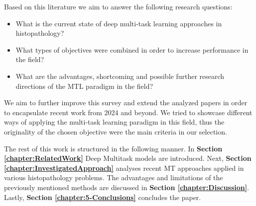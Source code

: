 \documentclass[conference]{IEEEtran}
\begin{document}
Based on this literature we aim to answer the following research questions:
\begin{itemize}
  \item What is the current state of deep multi-task learning approaches in histopathology?
  \item What types of objectives were combined in order to increase performance in the field?
  \item What are the advantages, shortcoming and possible further research directions of the MTL paradigm in the field?
\end{itemize}

We aim to further improve this survey and extend the analyzed papers in order to encapsulate recent work from 2024 and beyond. We tried to showcase different ways of applying the multi-task learning paradigm in this field, thus the originality of the chosen objective were the main criteria in our selection. 

The rest of this work is structured in the following manner. In \textbf{Section \ref{chapter:RelatedWork}} Deep Multitask models are introduced. Next, \textbf{Section \ref{chapter:InvestigatedApproach}} analyses recent MT approaches applied in various histopathology problems. The advantages and limitations of the previously mentioned methods are discussed in \textbf{Section \ref{chapter:Discussion}}. Lastly, \textbf{Section \ref{chapter:5-Conclusions}} concludes the paper.

%
%
\end{document}
